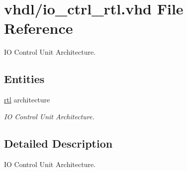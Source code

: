 \hypertarget{io__ctrl__rtl_8vhd}{}\section{vhdl/io\+\_\+ctrl\+\_\+rtl.vhd File Reference}
\label{io__ctrl__rtl_8vhd}


IO Control Unit Architecture.  


\subsection*{Entities}
\begin{DoxyCompactItemize}
\item 
\hyperlink{classio__ctrl_1_1rtl}{rtl} architecture
\begin{DoxyCompactList}\small\item\em IO Control Unit Architecture. \end{DoxyCompactList}\end{DoxyCompactItemize}


\subsection{Detailed Description}
IO Control Unit Architecture. 

